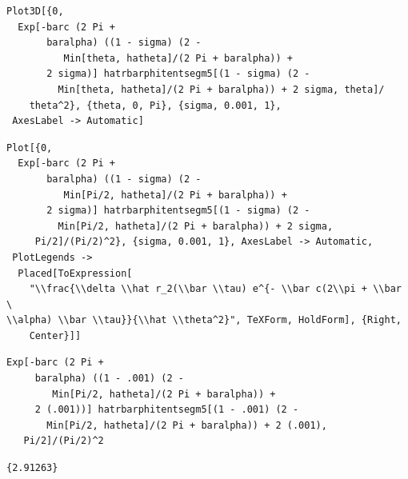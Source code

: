 \documentclass[reqno]{amsart}
\theoremstyle{definition} \newtheorem{definition}{Definition}[section]
\theoremstyle{definition} \newtheorem{remark}[definition]{Remark}
\theoremstyle{plain} \newtheorem{lemma}[definition]{Lemma}
\theoremstyle{plain} \newtheorem{proposition}[definition]{Proposition}
\theoremstyle{plain} \newtheorem{theorem}[definition]{Theorem}
\theoremstyle{plain} \newtheorem{corollary}[definition]{Corollary}
\theoremstyle{definition} \newtheorem{example}[definition]{Example}
\theoremstyle{plain} \newtheorem{claim}[clai]{Claim}
\theoremstyle{definition} \newtheorem{assumption}[definition]{Assumption}
\theoremstyle{definition} \newtheorem{observation}[definition]{Observation}
\newcommand{\1}{\mathbbm 1}
\newcommand{\sbig}{\bigskip}
\numberwithin{equation}{section} %
\theoremstyle{plain} \newtheorem*{theorem*}{Theorem}
\theoremstyle{plain} \newtheorem{mthm}[maintheorem]{Main Theorem}
\theoremstyle{plain} \newtheorem*{mthm*}{Main Theorem}
\theoremstyle{plain} \newtheorem*{conjecture*}{Conjecture}
\theoremstyle{plain} \newtheorem{conjecture}[definition]{Conjecture}
\theoremstyle{plain} \newtheorem*{problem*}{Problem}
\begin{document}
\begin{verbatim}
Plot3D[{0, 
  Exp[-barc (2 Pi + 
       baralpha) ((1 - sigma) (2 - 
          Min[theta, hatheta]/(2 Pi + baralpha)) + 
       2 sigma)] hatrbarphitentsegm5[(1 - sigma) (2 - 
         Min[theta, hatheta]/(2 Pi + baralpha)) + 2 sigma, theta]/
    theta^2}, {theta, 0, Pi}, {sigma, 0.001, 1}, 
 AxesLabel -> Automatic]
\end{verbatim}
\begin{verbatim}
Plot[{0, 
  Exp[-barc (2 Pi + 
       baralpha) ((1 - sigma) (2 - 
          Min[Pi/2, hatheta]/(2 Pi + baralpha)) + 
       2 sigma)] hatrbarphitentsegm5[(1 - sigma) (2 - 
         Min[Pi/2, hatheta]/(2 Pi + baralpha)) + 2 sigma, 
     Pi/2]/(Pi/2)^2}, {sigma, 0.001, 1}, AxesLabel -> Automatic, 
 PlotLegends -> 
  Placed[ToExpression[
    "\\frac{\\delta \\hat r_2(\\bar \\tau) e^{- \\bar c(2\\pi + \\bar \
\\alpha) \\bar \\tau}}{\\hat \\theta^2}", TeXForm, HoldForm], {Right, 
    Center}]]
\end{verbatim}
\begin{verbatim}
Exp[-barc (2 Pi + 
     baralpha) ((1 - .001) (2 - 
        Min[Pi/2, hatheta]/(2 Pi + baralpha)) + 
     2 (.001))] hatrbarphitentsegm5[(1 - .001) (2 - 
       Min[Pi/2, hatheta]/(2 Pi + baralpha)) + 2 (.001), 
   Pi/2]/(Pi/2)^2
\end{verbatim}
\begin{verbatim}
{2.91263}
\end{verbatim}

\sbig


\sbig
\end{document}
